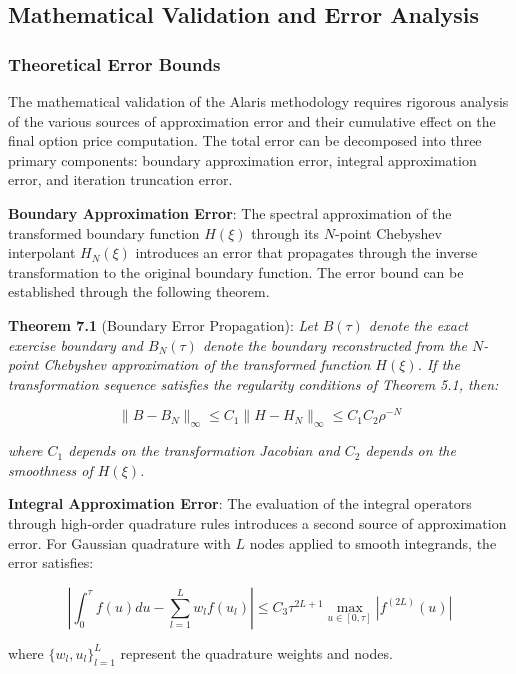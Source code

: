 \documentclass[
  11pt,
  11pt,
  letterpaper,
  onecolumn]{article}
\begin{document}
\subsection{Mathematical Validation and Error
Analysis}\label{mathematical-validation-and-error-analysis}

\subsubsection{Theoretical Error Bounds}\label{theoretical-error-bounds}

The mathematical validation of the Alaris methodology requires rigorous
analysis of the various sources of approximation error and their
cumulative effect on the final option price computation. The total error
can be decomposed into three primary components: boundary approximation
error, integral approximation error, and iteration truncation error.

\textbf{Boundary Approximation Error}: The spectral approximation of the
transformed boundary function \(H(\xi)\) through its \(N\)-point
Chebyshev interpolant \(H_N(\xi)\) introduces an error that propagates
through the inverse transformation to the original boundary function.
The error bound can be established through the following theorem.

\textbf{Theorem 7.1} (Boundary Error Propagation): \emph{Let \(B(\tau)\)
denote the exact exercise boundary and \(B_N(\tau)\) denote the boundary
reconstructed from the \(N\)-point Chebyshev approximation of the
transformed function \(H(\xi)\). If the transformation sequence
satisfies the regularity conditions of Theorem 5.1, then:}

\[\|B - B_N\|_{\infty} \leq C_1 \|H - H_N\|_{\infty} \leq C_1 C_2 \rho^{-N} \tag{7.1}\]

\emph{where \(C_1\) depends on the transformation Jacobian and \(C_2\)
depends on the smoothness of \(H(\xi)\).}

\textbf{Integral Approximation Error}: The evaluation of the integral
operators through high-order quadrature rules introduces a second source
of approximation error. For Gaussian quadrature with \(L\) nodes applied
to smooth integrands, the error satisfies:

\[\left|\int_0^\tau f(u) du - \sum_{l=1}^{L} w_l f(u_l)\right| \leq C_3 \tau^{2L+1} \max_{u \in [0,\tau]} |f^{(2L)}(u)| \tag{7.2}\]

where \(\{w_l, u_l\}_{l=1}^{L}\) represent the quadrature weights and
nodes.
\end{document}
